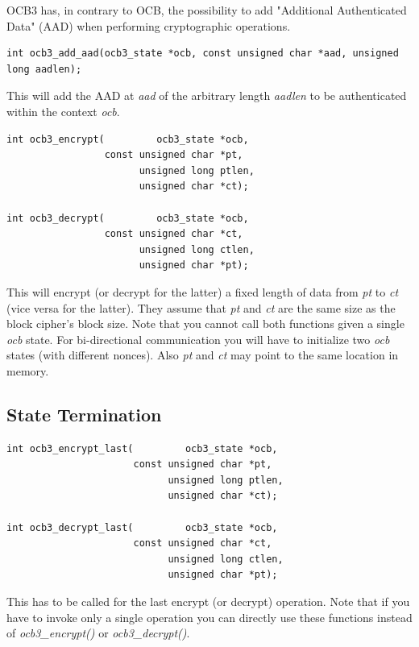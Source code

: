 \documentclass[synpaper]{book}
\begin{document}
OCB3 has, in contrary to OCB, the possibility to add "Additional Authenticated Data" (AAD) when performing cryptographic operations.

\begin{verbatim}
int ocb3_add_aad(ocb3_state *ocb, const unsigned char *aad, unsigned long aadlen);
\end{verbatim}

This will add the AAD at \textit{aad} of the arbitrary length \textit{aadlen} to be authenticated within the context \textit{ocb}.

 
\begin{verbatim}
int ocb3_encrypt(         ocb3_state *ocb,
                 const unsigned char *pt,
                       unsigned long ptlen,
                       unsigned char *ct);

int ocb3_decrypt(         ocb3_state *ocb,
                 const unsigned char *ct,
                       unsigned long ctlen,
                       unsigned char *pt);
\end{verbatim}

This will encrypt (or decrypt for the latter) a fixed length of data from \textit{pt} to \textit{ct} (vice versa for the latter).
They assume that \textit{pt} and \textit{ct} are the same size as the block cipher's block size.  Note that you cannot call
both functions given a single \textit{ocb} state.  For bi-directional communication you will have to initialize two \textit{ocb}
states (with different nonces).  Also \textit{pt} and \textit{ct} may point to the same location in memory.

\subsection{State Termination}

 
\begin{verbatim}
int ocb3_encrypt_last(         ocb3_state *ocb,
                      const unsigned char *pt,
                            unsigned long ptlen,
                            unsigned char *ct);

int ocb3_decrypt_last(         ocb3_state *ocb,
                      const unsigned char *ct,
                            unsigned long ctlen,
                            unsigned char *pt);
\end{verbatim}

This has to be called for the last encrypt (or decrypt) operation. Note that if you have to invoke only a single operation you can
directly use these functions instead of \textit{ocb3\_encrypt()} or \textit{ocb3\_decrypt()}.
\end{document}
